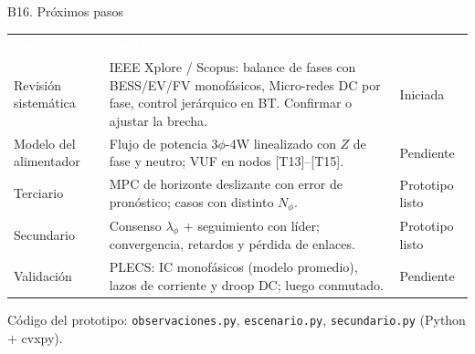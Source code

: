 \documentclass[aspectratio=169,10pt,t]{beamer}
\newcommand{\thead}{\rowcolor{usachO}}
\newcommand{\Th}[1]{\textcolor{white}{\textbf{#1}}}
\begin{document}
\begin{frame}{B16. Próximos pasos}
  \footnotesize\renewcommand{\arraystretch}{1.25}
  \begin{tabularx}{\textwidth}{@{}p{2.9cm}X p{2.0cm}@{}}
    \thead \Th{Tarea} & \Th{Contenido} & \Th{Estado} \\
    Revisión sistemática & IEEE Xplore / Scopus: balance de fases con BESS/EV/FV monofásicos, Micro-redes DC por fase, control jerárquico en BT. Confirmar o ajustar la brecha. & Iniciada \\
    Modelo del alimentador & Flujo de potencia 3$\phi$-4W linealizado con $Z$ de fase y neutro; VUF en nodos [T13]--[T15]. & Pendiente \\
    Terciario & MPC de horizonte deslizante con error de pronóstico; casos con distinto $N_\phi$. & Prototipo listo \\
    Secundario & Consenso $\lambda_\phi$ + seguimiento con líder; convergencia, retardos y pérdida de enlaces. & Prototipo listo \\
    Validación & PLECS: IC monofásicos (modelo promedio), lazos de corriente y droop DC; luego conmutado. & Pendiente \\
  \end{tabularx}

  \vspace{6pt}
  {\scriptsize Código del prototipo: \texttt{observaciones.py}, \texttt{escenario.py}, \texttt{secundario.py} (Python + cvxpy).}
\end{frame}
\end{document}
